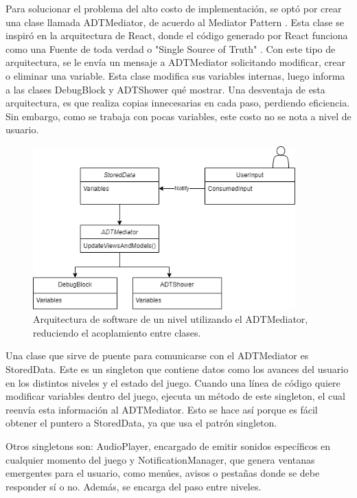 Para solucionar el problema del alto costo de implementación, se optó por crear una clase llamada ADTMediator, de acuerdo al Mediator Pattern \cite{Freeman2015TheMP}. Esta clase se inspiró en la arquitectura de React, donde el código generado por React funciona como una Fuente de toda verdad o "Single Source of Truth" \cite{ReactSingleSourceOfTruth}. Con este tipo de arquitectura, se le envía un mensaje a ADTMediator solicitando modificar, crear o eliminar una variable. Esta clase modifica sus variables internas, luego informa a las clases DebugBlock y ADTShower qué mostrar. Una desventaja de esta arquitectura, es que realiza copias innecesarias en cada paso, perdiendo eficiencia. Sin embargo, como se trabaja con pocas variables, este costo no se nota a nivel de usuario. 


\begin{figure}[h]
	\centering
	\includegraphics[width=0.9\textwidth]{imagenes/ArquitecturaMediatorAfter.png}
	\caption{Arquitectura de software de un nivel utilizando el ADTMediator, reduciendo el acoplamiento entre clases.}
	\label{ArquitecturaMediatorAfter}
\end{figure}

Una clase que sirve de puente para comunicarse con el ADTMediator es StoredData. Este es un singleton que contiene datos como los avances del usuario en los distintos niveles y el estado del juego. Cuando una línea de código quiere modificar variables dentro del juego, ejecuta un método de este singleton, el cual reenvía esta información al ADTMediator. Esto se hace así porque es fácil obtener el puntero a StoredData, ya que usa el patrón singleton.

Otros singletons son: AudioPlayer, encargado de emitir sonidos específicos en cualquier momento del juego y NotificationManager, que genera ventanas emergentes para el usuario, como menúes, avisos o pestañas donde se debe responder sí o no. Además, se encarga del paso entre niveles.